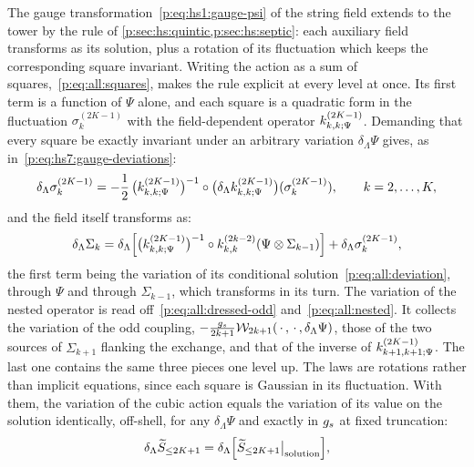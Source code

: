 The gauge transformation~\eqref{p:eq:hs1:gauge-psi} of the string field extends to the tower by the rule of \cref{p:sec:hs:quintic,p:sec:hs:septic}: each auxiliary field transforms as its solution, plus a rotation of its fluctuation which keeps the corresponding square invariant.
Writing the action as a sum of squares,~\eqref{p:eq:all:squares}, makes the rule explicit at every level at once.
Its first term is a function of $\Psi$ alone, and each square is a quadratic form in the fluctuation $\sigma_k^{(2 K - 1)}$ with the field-dependent operator $\kin{k}{\Psi}{2 K - 1}$.
Demanding that every square be exactly invariant under an arbitrary variation $\delta_\Lambda \Psi$ gives, as in~\eqref{p:eq:hs7:gauge-deviations}:
\begin{equation}
  \label{p:eq:all:gauge-deviations}
  \delta_\Lambda \sigma_k^{(2 K - 1)}
    = - \frac{1}{2} \, \big( \kin{k}{\Psi}{2 K - 1} \big)^{-1} \circ \big( \delta_\Lambda \kin{k}{\Psi}{2 K - 1} \big) (\sigma_k^{(2 K - 1)}),
  \qquad
  k = 2, \ldots, K,
\end{equation}
and the field itself transforms as:
\begin{equation}
  \label{p:eq:all:gauge-fields}
  \delta_\Lambda \Sigma_k
    = \delta_\Lambda \Big[ \big( \kin{k}{\Psi}{2 K - 1} \big)^{-1} \circ \kin{k}{}{2 k - 2}(\Psi \otimes \Sigma_{k - 1}) \Big]
      + \delta_\Lambda \sigma_k^{(2 K - 1)},
\end{equation}
the first term being the variation of its conditional solution~\eqref{p:eq:all:deviation}, through $\Psi$ and through $\Sigma_{k - 1}$, which transforms in its turn.
The variation of the nested operator is read off~\eqref{p:eq:all:dressed-odd} and~\eqref{p:eq:all:nested}.
It collects the variation of the odd coupling, $- \tfrac{\gs}{2 k + 1} \dvertex{2 k + 1}(\, \cdot \,, \, \cdot \,, \delta_\Lambda \Psi)$, those of the two sources of $\Sigma_{k + 1}$ flanking the exchange, and that of the inverse of $\kin{k + 1}{\Psi}{2 K - 1}$.
The last one contains the same three pieces one level up.
The laws are rotations rather than implicit equations, since each square is Gaussian in its fluctuation.
With them, the variation of the cubic action equals the variation of its value on the solution identically, off-shell, for any $\delta_\Lambda \Psi$ and exactly in $\gs$ at fixed truncation:
\begin{equation}
  \label{p:eq:all:delta-S-equal}
  \delta_\Lambda \caction[\le 2 K + 1]
    = \delta_\Lambda \Big[ \caction[\le 2 K + 1] \big|_{\text{solution}} \Big],
\end{equation}
